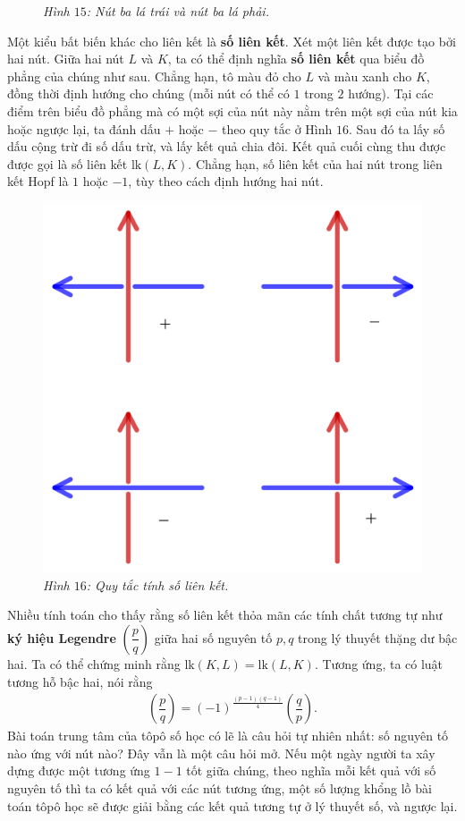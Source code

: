 \begin{multicols}{2}
\begin{figure}[H]
		\caption{\small\textit{\color{duongvaotoanhoc}Hình $15$: Nút ba lá trái và nút ba lá phải.}}
		\vspace*{-10pt}
	\end{figure}
	Một kiểu bất biến khác cho liên kết là {\bf\color{duongvaotoanhoc} số liên kết}. Xét một liên kết được tạo bởi hai nút. Giữa hai nút $L$ và $K$, ta có thể định nghĩa {\bf\color{duongvaotoanhoc} số liên kết} qua biểu đồ phẳng của chúng như sau. Chẳng hạn, tô màu đỏ cho $L$ và màu xanh cho $K$, đồng thời định hướng cho chúng (mỗi nút có thể có $1$ trong $2$ hướng). Tại các điểm trên biểu đồ phẳng mà có một sợi của nút này nằm trên một sợi của nút kia hoặc ngược lại, ta đánh dấu $+$ hoặc $-$ theo quy tắc ở Hình $16$. Sau đó ta lấy số dấu cộng trừ đi số dấu trừ, và lấy kết quả chia đôi. Kết quả cuối cùng thu được được gọi là số liên kết $\text{lk}(L,K)$. Chẳng hạn, số liên kết của hai nút trong liên kết Hopf là $1$ hoặc $-1$, tùy theo cách định hướng hai nút.
	\begin{figure}[H]
		\vspace*{-5pt}
		\centering
		\captionsetup{labelformat= empty, justification=centering}
		\includegraphics[width= 0.75\linewidth]{h16}
		\caption{\small\textit{\color{duongvaotoanhoc}Hình $16$: Quy tắc tính số liên kết.}}
		\vspace*{-10pt}
	\end{figure}
	Nhiều tính toán cho thấy rằng số liên kết thỏa mãn các tính chất tương tự như {\bf\color{duongvaotoanhoc} ký hiệu Legendre} $\left(\dfrac{p}{q}\right)$ giữa hai số nguyên tố $p, q$ trong lý thuyết thặng dư bậc hai. Ta có thể chứng minh rằng $\text{lk}(K,L) = \text{lk}(L,K)$. Tương ứng, ta có luật tương hỗ bậc hai, nói rằng 
	\begin{align*}
		\left(\dfrac{p}{q}\right) = (-1)^{\tfrac{(p-1)(q-1)}{4}}\left(\dfrac{q}{p}\right).
	\end{align*}
	Bài toán trung tâm của tôpô số học có lẽ là câu hỏi tự nhiên nhất: số nguyên tố nào ứng với nút nào? Đây vẫn là một câu hỏi mở. Nếu một ngày người ta xây dựng được một tương ứng $1-1$ tốt giữa chúng, theo nghĩa mỗi kết quả với số nguyên tố thì ta có kết quả với các nút tương ứng, một số lượng khổng lồ bài toán tôpô học sẽ được giải bằng các kết quả tương tự ở lý thuyết số, và ngược lại.
	

\end{multicols}
